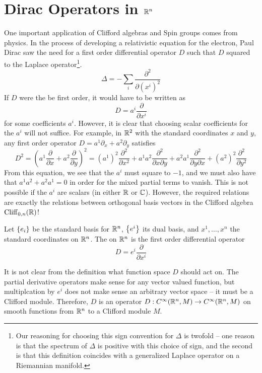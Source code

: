 %
\section{Dirac Operators in $\mathbb{R}^n$}
%
One important application of Clifford algebras and Spin groups comes from
physics. In the process of developing a relativistic equation for the electron,
Paul Dirac saw the need for a first order differential operator $D$ such
that $D$ squared to the Laplace operator\footnote{Our reasoning for choosing this sign
convention for $\Delta$ is twofold -- one reason is that the spectrum of $\Delta$
is positive with this choice of sign, and the second is that this definition
coincides with a generalized Laplace operator on a Riemannian manifold.}.
\[
\Delta = -\sum_i \frac{\partial^2}{\partial(x^i)^2}
\]
If $D$ were the be first order, it would have to be written as
\[
D = a^i \frac{\partial}{\partial x^i}
\]
for some coefficients $a^i$. However, it is clear that choosing scalar coefficients
for the $a^i$ will not suffice. For example, in $\mathbb{R}^2$ with the standard coordinates
$x$ and $y$, any first order operator $D = a^1\partial_x + a^2\partial_y$ satisfies
\[
D^2 = \left(a^1\frac{\partial}{\partial x} + a^2\frac{\partial}{\partial y}\right)^2
= (a^1)^2\frac{\partial^2}{\partial x^2} + a^1a^2\frac{\partial^2}{\partial x \partial y}
+ a^2a^1 \frac{\partial^2}{\partial y \partial x} + (a^2)^2 \frac{\partial^2}{\partial y^2}
\]
From this equation, we see that the $a^i$ must square to $-1$, and we must also
have that $a^1a^2 + a^2a^1 = 0$ in order for the mixed partial terms to vanish.
This is not possible if the $a^i$ are scalars (in either $\mathbb{R}$ or $\mathbb{C}$).
However, the required relations are exactly the relations between orthogonal
basis vectors in the Clifford algebra $\operatorname{Cliff}_{0,n}(\mathbb{R})$!
%
\begin{defn}
Let $\left\lbrace e_i \right\rbrace$ be the standard basis for $\mathbb{R}^n$, $\left\lbrace e^i \right\rbrace$ its dual basis, and
$x^1, \ldots ,x^n$ the standard coordinates on $\mathbb{R}^n$.
The  on $\mathbb{R}^n$ is the first order differential operator
\[
D = e^i\frac{\partial}{\partial x^i}
\]
\end{defn}
%
It is not clear from the definition what function space $D$ should act on.
The partial derivative operators make sense for any vector valued function, but
multiplcation by $e^i$ does not make sense an arbitrary vector space -- it must
be a Clifford module. Therefore, $D$ is an operator
$D: C^\infty(\mathbb{R}^n, M) \to C^\infty(\mathbb{R}^n, M)$ on smooth functions from $\mathbb{R}^n$
to a Clifford module $M$.
%
%
